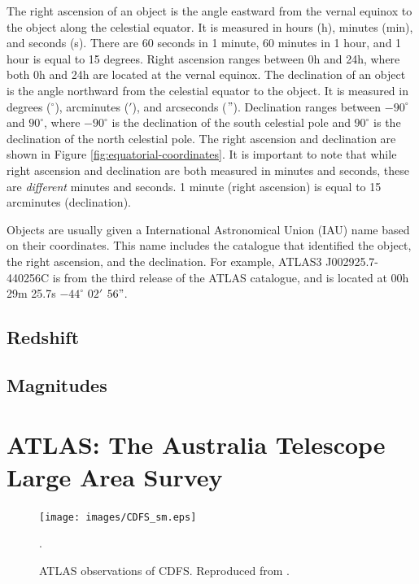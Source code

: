             The right ascension of an object is the angle eastward from the vernal equinox to the object along the celestial equator. It is measured in hours (h), minutes (min), and seconds (s). There are 60 seconds in 1 minute, 60 minutes in 1 hour, and 1 hour is equal to 15 degrees. Right ascension ranges between 0h and 24h, where both 0h and 24h are located at the vernal equinox. The declination of an object is the angle northward from the celestial equator to the object. It is measured in degrees (${}^\circ$), arcminutes ($'$), and arcseconds ($"$). Declination ranges between $-90^\circ$ and $90^\circ$, where $-90^\circ$ is the declination of the south celestial pole and $90^\circ$ is the declination of the north celestial pole. The right ascension and declination are shown in Figure \ref{fig:equatorial-coordinates}. It is important to note that while right ascension and declination are both measured in minutes and seconds, these are \emph{different} minutes and seconds. 1 minute (right ascension) is equal to 15 arcminutes (declination).

            Objects are usually given a International Astronomical Union (IAU) name based on their coordinates. This name includes the catalogue that identified the object, the right ascension, and the declination. For example, ATLAS3 J002925.7-440256C is from the third release of the ATLAS catalogue, and is located at 00h 29m 25.7s $-44^\circ$ $02'$ $56"$.


        \subsection{Redshift}

        \subsection{Magnitudes}

    \section{ATLAS: The Australia Telescope Large Area Survey}

        \begin{figure}[!ht]
          \texttt{[image: images/CDFS\_sm.eps]}
          \caption{ATLAS observations of CDFS. Reproduced from \citet{franzen15}.}.
          \label{fig:cdfs}
        \end{figure}

